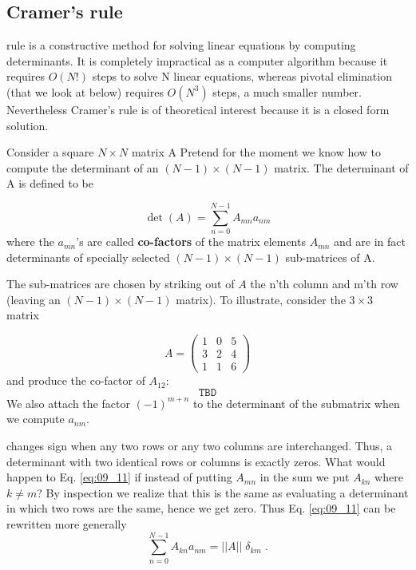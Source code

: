 \subsection{Cramer's rule}

 rule is a constructive method for solving linear equations
by computing determinants. It is completely impractical
as a computer algorithm because it requires $O(N!)$ steps to solve
N linear equations, whereas pivotal elimination (that we look at
below) requires $O(N^3)$ steps, a much smaller number. Nevertheless Cramer's
rule is of theoretical interest because it is a closed form solution.

Consider a square $N\times N$ matrix A Pretend for the moment we
know how to compute the determinant of an $(N-1)\times(N-1)$
matrix. The determinant of A is defined to be

\begin{equation}
    \det(A) = \sum_{n=0}^{N-1}A_{mn} a_{nm}    \nonumber
\end{equation}
where the $a_{mn}$'s are called \textbf{co-factors} of the matrix elements $A_{mn}$
and are in fact determinants of specially selected $(N-1)\times(N-1)$
sub-matrices of A.

The sub-matrices are chosen by striking out of $A$ the n'th column
and m'th row (leaving an $(N-1)\times(N-1)$ matrix). To illustrate,
consider the $3 \times 3$ matrix
\addtocounter{equation}{1} 
\begin{equation}
    \label{eq:09_11}
    A = 
    \begin{pmatrix}
        1 & 0 & 5\\ 
        3 & 2 & 4\\ 
        1 & 1 & 6
    \end{pmatrix}
\end{equation}
and produce the co-factor of $A_{12}$:
\begin{equation}
	\texttt{TBD}\label{eq:09_12}
\end{equation}
We also attach the factor $(-1)^{m+n}$ to the determinant of the
submatrix when we compute $a_{nm}$.

 changes sign when any two rows or any two 
columns are interchanged. Thus, a determinant with two identical rows or
columns is exactly zeros. What would happen to
Eq. \ref{eq:09_11} if instead of putting $A_{mn}$ in the sum we put $A_{kn}$ where
$k\neq m$? By inspection we realize that this is the same as evaluating
a determinant in which two rows are the same, hence we get zero.
Thus Eq. \ref{eq:09_11} can be rewritten more generally
\begin{equation}
	\sum_{n=0}^{N-1}A_{kn}a_{nm}=||A||\;\delta_{km}\;.\label{eq:09_13}
\end{equation}

